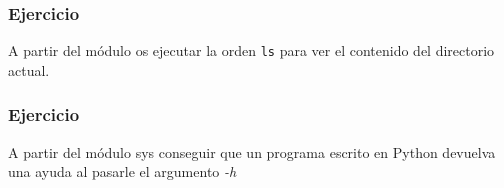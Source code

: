 \documentclass{beamer}
\begin{document}
\begin{frame}
  \frametitle{Ejercicio}
  A partir del módulo os ejecutar la orden \texttt{ls} para ver el
  contenido del directorio actual.
\end{frame}

\begin{frame}
  \frametitle{Ejercicio}
  A partir del módulo sys conseguir que un programa escrito en Python
  devuelva una ayuda al pasarle el argumento \emph{-h}
\end{frame}






\end{document}
